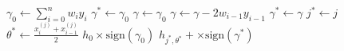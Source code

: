\begin{algorithm}[htpb]
	\caption{}
	\label{alg:dstumps}
	\begin{algorithmic}[1]
		\State $\gamma_{0} \gets \sum_{i=0}^{n}w_{i}y_{i}$
		\State $\gamma^{*} \gets \gamma_{0}$
			\State $\gamma \gets \gamma_{0}$
				\State $\gamma \gets \gamma - 2w_{i-1}y_{i-1}$
					\If{$|\gamma| > |\gamma^{*}|$}
						\State $\gamma^{*} \gets \gamma$
						\State $j^{*} \gets j$
						\State $\theta^{*} \gets \frac{x_{i}^{(j)} + x_{i-1}^{(j)}}{2}$
					\EndIf
				\EndIf
			\EndFor
		\EndFor
		\If{$\gamma^{*} = \gamma$}{}
			\Return $h_{0}\times\text{sign}(\gamma_{0})$
		\Else{}
			\Return $h_{j^{*},\theta^{*}}+\times\text{sign}(\gamma^{*})$
		\EndIf
		\EndProcedure
	\end{algorithmic}
\end{algorithm}


